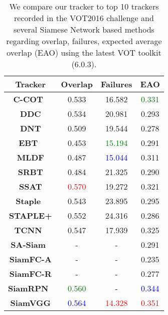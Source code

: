 \documentclass[runningheads]{llncs}
\begin{document}
\begin{table}
\begin{center}
\caption{We compare our tracker to top 10 trackers recorded in the VOT2016 challenge and several Siamese Network based methods regarding overlap, failures, expected average overlap (EAO) using the latest VOT toolkit (6.0.3).}
\label{table:vot2016}
\begin{tabular}{cccc}
\hline


\textbf{Tracker}&\textbf{Overlap} & \textbf{Failures} & \textbf{EAO} \\\hline

\textbf{C-COT~\cite{danelljan2016beyond}} & 0.533 & 16.582 &\textcolor{green}{ 0.331}  \\
\textbf{DDC} & 0.534 & 20.981 & 0.293 \\
\textbf{DNT} & 0.509 & 19.544 & 0.278  \\
\textbf{EBT~\cite{zhu2015tracking}} & 0.453 & \textcolor{green}{15.194} & 0.291 \\
\textbf{MLDF} & 0.487 & \textcolor{blue}{15.044} & 0.311\\
\textbf{SRBT} & 0.484 & 21.325 & 0.290\\
\textbf{SSAT} & \textcolor{red}{0.570} & 19.272 & 0.321  \\
\textbf{Staple~\cite{bertinetto2016staple}} & 0.543 & 23.895 & 0.295  \\
\textbf{STAPLE+} & 0.552 & 24.316 & 0.286  \\
\textbf{TCNN~\cite{nam2016modeling}} & 0.547 & 17.939 & 0.325  \\\hline


\textbf{SA-Siam~\cite{he2018twofold}} & - & - & 0.291  \\

\textbf{SiamFC-A} & - & - & 0.235  \\
\textbf{SiamFC-R} & - & - & 0.277  \\

\textbf{SiamRPN~\cite{li2018high}} & \textcolor{green}{0.560} & - & \textcolor{blue}{0.344}  \\\hline

\textbf{SiamVGG} & \textcolor{blue}{0.564} & \textcolor{red}{14.328} & \textcolor{red}{0.351} \\\hline

\end{tabular}
\end{center}
\end{table}
\setlength{\tabcolsep}{1.4pt}
\end{document}
